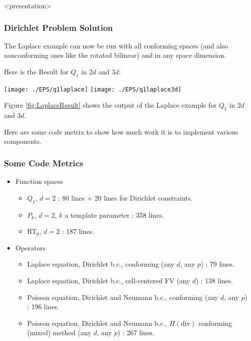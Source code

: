 \begin{frame}<presentation>
\frametitle<presentation>{Dirichlet Problem Solution}
The Laplace example can now be run with all conforming spaces (and
also nonconforming ones like the rotated bilinear) and in any space
dimension.

Here is the Result for $Q_1$ in $2d$ and $3d$:
\begin{center}
\texttt{[image: ./EPS/q1laplace]}\hfill
\texttt{[image: ./EPS/q1laplace3d]}
\end{center}
\end{frame}

Figure \ref{fig:LaplaceResult} shows the output of the Laplace example
for $Q_1$ in $2d$ and $3d$.


Here are some code metrix to show how much work it is to implement
various components.

\begin{frame}
\frametitle<presentation>{Some Code Metrics}
\begin{itemize}
\item Function spaces
\begin{itemize}
\item $Q_1$, $d=2$ : 80 lines + 20 lines for Dirichlet constraints.
\item $P_k$, $d=2$, $k$ a template parameter : 358 lines.
\item RT$_0$, $d=2$ : 187 lines.
\end{itemize}
\item Operators
\begin{itemize}
\item Laplace equation, Dirichlet b.c., conforming (any $d$, any $p$) : 79 lines.
\item Laplace equation, Dirichlet b.c., cell-centered FV (any $d$) : 138 lines.
\item Poisson equation, Dirichlet and Neumann b.c., conforming (any $d$, any $p$) : 196 lines.
\item Poisson equation, Dirichlet and Neumann b.c., $H(\text{div})$
conforming (mixed) method (any $d$, any $p$) : 267 lines.
\end{itemize}
\end{itemize}
\end{frame}


